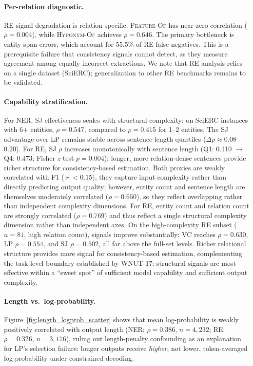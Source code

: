 \paragraph{Per-relation diagnostic.}
RE signal degradation is relation-specific.
\textsc{Feature-Of} has near-zero correlation ($\rho{=}0.004$), while \textsc{Hyponym-Of} achieves $\rho{=}0.646$.
The primary bottleneck is entity span errors, which account for 55.5\% of RE false negatives. This is a prerequisite failure that consistency signals cannot detect, as they measure agreement among equally incorrect extractions.
We note that RE analysis relies on a single dataset (SciERC); generalization to other RE benchmarks remains to be validated.

\paragraph{Capability stratification.}
For NER, SJ effectiveness scales with structural complexity: on SciERC instances with 6+ entities, $\rho{=}0.547$, compared to $\rho{=}0.415$ for 1--2 entities.
The SJ advantage over LP remains stable across sentence-length quartiles ($\Delta\rho{\approx}0.08$--$0.20$).
For RE, SJ $\rho$ increases monotonically with sentence length (Q1: 0.110 $\to$ Q4: 0.473; Fisher $z$-test $p{=}0.004$): longer, more relation-dense sentences provide richer structure for consistency-based estimation.
Both proxies are weakly correlated with F1 ($|r|{<}0.15$), they capture input complexity rather than directly predicting output quality; however, entity count and sentence length are themselves moderately correlated ($\rho{=}0.650$), so they reflect overlapping rather than independent complexity dimensions.
For RE, entity count and relation count are strongly correlated ($\rho{=}0.769$) and thus reflect a single structural complexity dimension rather than independent axes.
On the high-complexity RE subset ($n{=}81$, high relation count), signals improve substantially: VC reaches $\rho{=}0.630$, LP $\rho{=}0.554$, and SJ $\rho{=}0.502$, all far above the full-set levels.
Richer relational structure provides more signal for consistency-based estimation, complementing the task-level boundary established by WNUT-17: structural signals are most effective within a ``sweet spot'' of sufficient model capability and sufficient output complexity.

\paragraph{Length vs.\ log-probability.}
Figure~\ref{fig:length_logprob_scatter} shows that mean log-probability is weakly positively correlated with output length (NER: $\rho{=}0.386$, $n{=}4{,}232$; RE: $\rho{=}0.326$, $n{=}3{,}176$), ruling out length-penalty confounding as an explanation for LP's selection failure: longer outputs receive \textit{higher}, not lower, token-averaged log-probability under constrained decoding.

